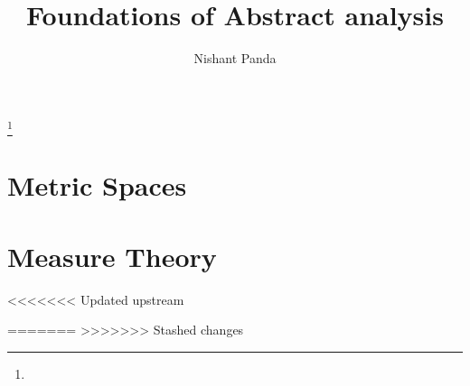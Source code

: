 \documentclass{gsm-l}
\begin{document}
\frontmatter

\title{Foundations of Abstract analysis}

\author{Nishant Panda}
\address{2451 S. Timberline Rd, Apt 4, Fort Collins, Co 80525}
\curraddr{}
\thanks{}



\maketitle
\setcounter{page}{5}
\tableofcontents

%

\mainmatter{}
\part{Metric Spaces}

\part{Measure Theory}


<<<<<<< Updated upstream


=======
%
%
>>>>>>> Stashed changes

\appendix


\backmatter{}
%
%

\printindex
\end{document}
